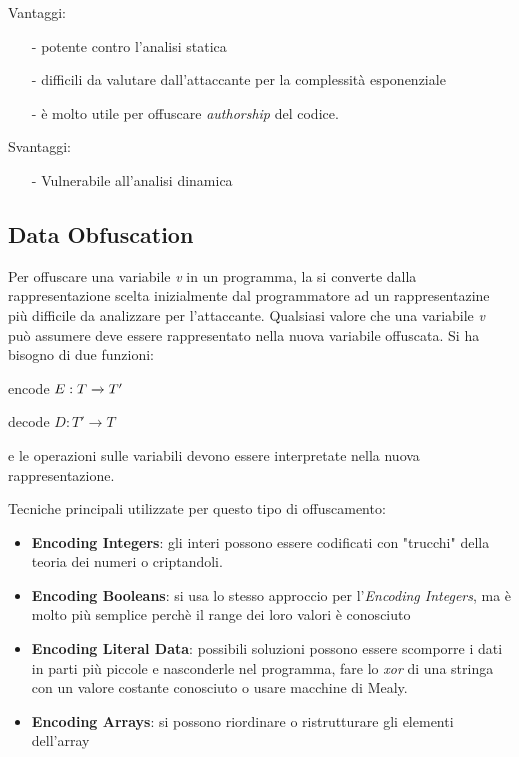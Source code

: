\documentclass[a4paper,oneside,openright,titlepage,10pt,footinclude,headinclude]{scrbook}
\begin{document}
Vantaggi: 
\begin{itemize}
\item[-]
potente contro l'analisi statica
\item[-]
difficili da valutare dall'attaccante per la complessità esponenziale
\item[-]
è molto utile per offuscare \emph{authorship} del codice.
\end{itemize}

Svantaggi:
\begin{itemize}
\item[-]
Vulnerabile all'analisi dinamica 
\end{itemize}

\subsection{Data Obfuscation}
Per offuscare una variabile \textit{v} in un programma, la si converte dalla rappresentazione scelta inizialmente dal programmatore ad un rappresentazine più difficile da analizzare per l'attaccante. Qualsiasi valore che una variabile \textit{v} può assumere deve essere
rappresentato nella nuova variabile offuscata. Si ha bisogno di due funzioni: 

\begin{center}
encode $ \medskip E: T \xrightarrow{} T'$
\end{center}

\begin{center}
decode $ D: T' \xrightarrow{} T$
\end{center}

e le operazioni sulle variabili devono essere interpretate nella nuova rappresentazione.

\noindent Tecniche principali utilizzate per questo tipo di offuscamento:
\begin{itemize}
\item
\textbf{Encoding Integers}: gli interi possono essere codificati con "trucchi" della teoria dei numeri o criptandoli.
\item
\textbf{Encoding Booleans}: si usa lo stesso approccio per l'\textit{Encoding Integers}, ma è molto più semplice perchè il range dei loro valori è conosciuto
\item
\textbf{Encoding Literal Data}: possibili soluzioni possono essere scomporre i dati in parti più piccole e nasconderle nel programma, fare lo \textit{xor} di una stringa con un valore costante conosciuto o usare macchine di Mealy.
\item
\textbf{Encoding Arrays}: si possono riordinare o ristrutturare gli elementi dell'array
\end{itemize}
\end{document}
